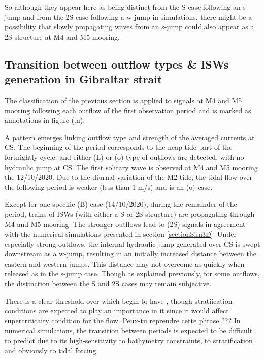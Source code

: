 So although \color{blue} they appear here as being distinct from the S case following an s-jump and from the 2S case following a w-jump in simulations, there might be a possibility \color{black} that slowly propagating waves from an s-jump could also appear as a 2S structure at M4 and M5 mooring.


\subsection{Transition between outflow types \& ISWs generation in Gibraltar strait}

The classification of the previous section is applied to signals at M4 and M5 mooring following each outflow of the first observation period and is marked as annotations in figure (.n).

A pattern emerges linking outflow type and strength of the averaged currents at CS. The beginning of the period corresponds to the neap-tide part of the fortnightly cycle, and either (L) or (o) type of outflows are detected, with no hydraulic jump at CS. The first solitary wave is observed at M4 and M5 mooring the 12/10/2020. Due to \color{blue} the diurnal variation \color{black} of the M2 tide, the tidal flow over the following period is weaker (less than 1 m/s) and is an (o) case.

Except for one specific (B) case (14/10/2020), during the remainder of the period, trains of ISWs (with either a S or 2S structure) are propagating through M4 and M5 mooring. The stronger outflows lead to (2S) signals \color{blue} in agreement with the \color{black}numerical simulations presented in section \ref{sectionSim3D}. Under especially strong outflows, the internal hydraulic jump generated over CS is swept downstream as a w-jump, resulting in an initially increased distance between the eastern and western jumps. This distance may not overcome as quickly  \color{blue}when released \color{black} as in the s-jump case. Though as explained previously, for some outflows, the distinction between the S and 2S cases \color{blue} may remain \color{black} subjective.

\color{green}There is a clear threshold over which begin to have , though stratiication conditions are expected to play an importance in it since it would affect supercriticaity condition for the flow. Peux-tu reprendre cette phrase ??? \color{black} In numerical simulations, the transition between \color{blue} periods  \color{black} is expected to be difficult to predict \color{blue} due to its high-sensitivity to bathymetry constraints, to stratification and obviously to tidal forcing.

